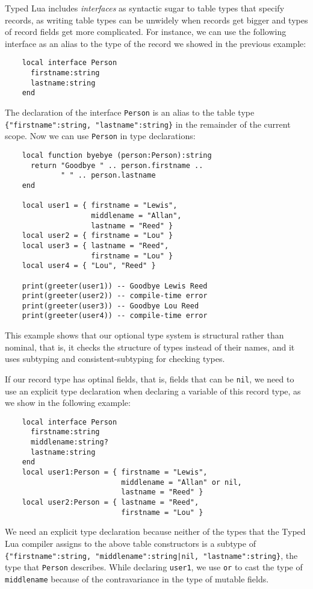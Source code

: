 Typed Lua includes \emph{interfaces} as syntactic sugar to table types
that specify records, as writing table types can be unwidely when
records get bigger and types of record fields get more complicated.
For instance, we can use the following interface as an alias to the
type of the record we showed in the previous example:
\begin{verbatim}
    local interface Person
      firstname:string
      lastname:string
    end
\end{verbatim}

The declaration of the interface \texttt{Person} is an alias to the
table type \texttt{\{"firstname":string, "lastname":string\}} in the
remainder of the current scope.
Now we can use \texttt{Person} in type declarations:
\begin{verbatim}
    local function byebye (person:Person):string
      return "Goodbye " .. person.firstname ..
             " " .. person.lastname
    end

    local user1 = { firstname = "Lewis",
                    middlename = "Allan",
                    lastname = "Reed" }
    local user2 = { firstname = "Lou" }
    local user3 = { lastname = "Reed",
                    firstname = "Lou" }
    local user4 = { "Lou", "Reed" }

    print(greeter(user1)) -- Goodbye Lewis Reed 
    print(greeter(user2)) -- compile-time error
    print(greeter(user3)) -- Goodbye Lou Reed
    print(greeter(user4)) -- compile-time error
\end{verbatim}

This example shows that our optional type system is structural rather
than nominal, that is, it checks the structure of types instead of
their names, and it uses subtyping and consistent-subtyping for
checking types.

If our record type has optinal fields, that is, fields that can be \texttt{nil},
we need to use an explicit type declaration when declaring a
variable of this record type, as we show in the following example:
\begin{verbatim}
    local interface Person
      firstname:string
      middlename:string?
      lastname:string
    end
    local user1:Person = { firstname = "Lewis",
                           middlename = "Allan" or nil,
                           lastname = "Reed" }
    local user2:Person = { lastname = "Reed",
                           firstname = "Lou" }
\end{verbatim}

We need an explicit type declaration because neither of the types
that the Typed Lua compiler assigns to the above table constructors
is a subtype of
\texttt{\{"firstname":string, "middlename":string|nil, "lastname":string\}},
the type that \texttt{Person} describes.
While declaring \texttt{user1}, we use \texttt{or} to cast the type of
\texttt{middlename} because of the contravariance in the type of
mutable fields.

